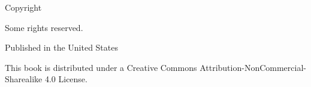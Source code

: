 \pagestyle{empty}

  \begin{center}

  \sffamily

  \makeatletter  \small \thetitle \par \makeatother
  \makeatletter  \small \textit{\thesubtitle} \par \makeatother

    Copyright \ccLogo\ \makeatletter \thedate \ \theauthor \makeatother \par
    Some rights reserved. \par

    \vspace{0.4cm}

    Published in the United States

    \vspace{0.4cm}

    This book is distributed under a Creative Commons Attribution-NonCommercial-Sharealike 4.0 License. \par

    \vspace{0.4cm}

    \ccbyncsa

  \end{center}

